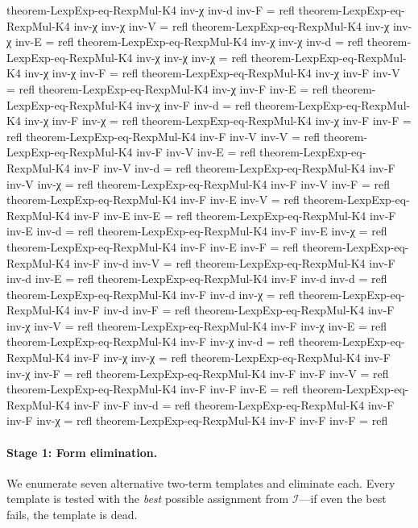 \documentclass[11pt,a4paper]{article}
\begin{document}
\begin{code}
theorem-LexpExp-eq-RexpMul-K4 inv-χ inv-d inv-F = refl
theorem-LexpExp-eq-RexpMul-K4 inv-χ inv-χ inv-V = refl
theorem-LexpExp-eq-RexpMul-K4 inv-χ inv-χ inv-E = refl
theorem-LexpExp-eq-RexpMul-K4 inv-χ inv-χ inv-d = refl
theorem-LexpExp-eq-RexpMul-K4 inv-χ inv-χ inv-χ = refl
theorem-LexpExp-eq-RexpMul-K4 inv-χ inv-χ inv-F = refl
theorem-LexpExp-eq-RexpMul-K4 inv-χ inv-F inv-V = refl
theorem-LexpExp-eq-RexpMul-K4 inv-χ inv-F inv-E = refl
theorem-LexpExp-eq-RexpMul-K4 inv-χ inv-F inv-d = refl
theorem-LexpExp-eq-RexpMul-K4 inv-χ inv-F inv-χ = refl
theorem-LexpExp-eq-RexpMul-K4 inv-χ inv-F inv-F = refl
theorem-LexpExp-eq-RexpMul-K4 inv-F inv-V inv-V = refl
theorem-LexpExp-eq-RexpMul-K4 inv-F inv-V inv-E = refl
theorem-LexpExp-eq-RexpMul-K4 inv-F inv-V inv-d = refl
theorem-LexpExp-eq-RexpMul-K4 inv-F inv-V inv-χ = refl
theorem-LexpExp-eq-RexpMul-K4 inv-F inv-V inv-F = refl
theorem-LexpExp-eq-RexpMul-K4 inv-F inv-E inv-V = refl
theorem-LexpExp-eq-RexpMul-K4 inv-F inv-E inv-E = refl
theorem-LexpExp-eq-RexpMul-K4 inv-F inv-E inv-d = refl
theorem-LexpExp-eq-RexpMul-K4 inv-F inv-E inv-χ = refl
theorem-LexpExp-eq-RexpMul-K4 inv-F inv-E inv-F = refl
theorem-LexpExp-eq-RexpMul-K4 inv-F inv-d inv-V = refl
theorem-LexpExp-eq-RexpMul-K4 inv-F inv-d inv-E = refl
theorem-LexpExp-eq-RexpMul-K4 inv-F inv-d inv-d = refl
theorem-LexpExp-eq-RexpMul-K4 inv-F inv-d inv-χ = refl
theorem-LexpExp-eq-RexpMul-K4 inv-F inv-d inv-F = refl
theorem-LexpExp-eq-RexpMul-K4 inv-F inv-χ inv-V = refl
theorem-LexpExp-eq-RexpMul-K4 inv-F inv-χ inv-E = refl
theorem-LexpExp-eq-RexpMul-K4 inv-F inv-χ inv-d = refl
theorem-LexpExp-eq-RexpMul-K4 inv-F inv-χ inv-χ = refl
theorem-LexpExp-eq-RexpMul-K4 inv-F inv-χ inv-F = refl
theorem-LexpExp-eq-RexpMul-K4 inv-F inv-F inv-V = refl
theorem-LexpExp-eq-RexpMul-K4 inv-F inv-F inv-E = refl
theorem-LexpExp-eq-RexpMul-K4 inv-F inv-F inv-d = refl
theorem-LexpExp-eq-RexpMul-K4 inv-F inv-F inv-χ = refl
theorem-LexpExp-eq-RexpMul-K4 inv-F inv-F inv-F = refl
\end{code}


\paragraph{Stage 1: Form elimination.}
We enumerate seven alternative two-term templates and eliminate each.
Every template is tested with the \emph{best} possible assignment from
$\mathcal{I}$---if even the best fails, the template is dead.
\end{document}
